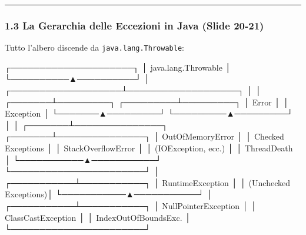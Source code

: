 \documentclass[11pt,a4paper]{article}
\newcommand{\passthrough}[1]{#1}
\begin{document}
\begin{center}\rule{0.5\linewidth}{0.5pt}\end{center}

\subsubsection{1.3 La Gerarchia delle Eccezioni in Java (Slide
20-21)}\label{la-gerarchia-delle-eccezioni-in-java-slide-20-21}

Tutto l'albero discende da
\passthrough{\lstinline!java.lang.Throwable!}:

\needspace{7cm}
\begin{asciibox}
                 ┌─────────────────────┐
                 │ java.lang.Throwable │
                 └──────────▲──────────┘
                            │
        ┌───────────────────┴───────────────────┐
        │                                       │
┌───────┴─────────┐                   ┌─────────┴─────────┐
│      Error      │                   │     Exception     │
└───────▲─────────┘                   └─────────▲─────────┘
        │                                       │
┌───────┴───────────────┐               ┌───────┴───────────────┐
│  OutOfMemoryError     │               │  Checked Exceptions   │
│  StackOverflowError   │               │ (IOException, ecc.)   │
│  ThreadDeath          │               └───────────▲───────────┘
└───────────────────────┘                           │
                                        ┌───────────┴───────────┐
                                        │   RuntimeException    │
                                        │ (Unchecked Exceptions)│
                                        └───────────▲───────────┘
                                                    │
                                        ┌───────────┴───────────┐
                                        │ NullPointerException  │
                                        │ ClassCastException    │
                                        │ IndexOutOfBoundsExc.  │
                                        └───────────────────────┘
\end{asciibox}
\end{document}
